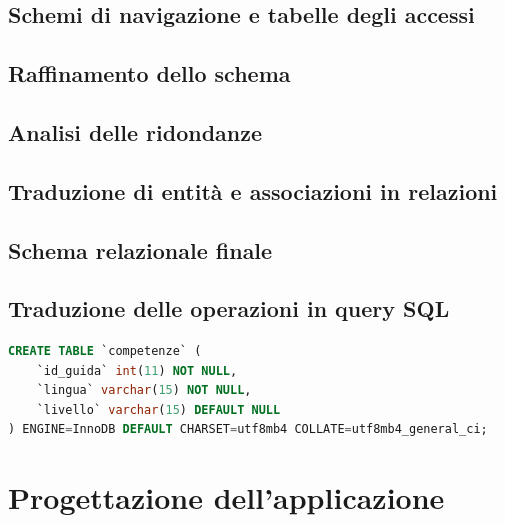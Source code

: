 \documentclass[a4paper,12pt]{report}
\begin{document}
\section{Schemi di navigazione e tabelle degli accessi}
\section{Raffinamento dello schema}
\section{Analisi delle ridondanze}
\section{Traduzione di entità e associazioni in relazioni}


\section{Schema relazionale finale}
\newpage
\section{Traduzione delle operazioni in query SQL}
\begin{lstlisting}[style=codeStyle,language=SQL]
	CREATE TABLE `competenze` (
  	`id_guida` int(11) NOT NULL,
  	`lingua` varchar(15) NOT NULL,
  	`livello` varchar(15) DEFAULT NULL
) ENGINE=InnoDB DEFAULT CHARSET=utf8mb4 COLLATE=utf8mb4_general_ci;
\end{lstlisting}
\newpage
\chapter{Progettazione dell'applicazione}
\end{document}
